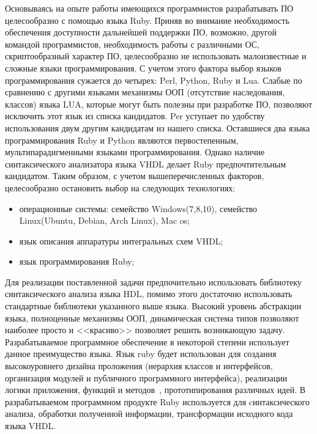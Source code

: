 Основываясь на опыте работы имеющихся программистов разрабатывать ПО целесообразно с помощью языка Ruby.
Приняв во внимание необходимость обеспечения доступности дальнейшей поддержки ПО, возможно, другой командой программистов, необходимость работы с различными ОС, скриптообразный характер ПО, целесообразно не использовать малоизвестные и сложные языки программирования.
С учетом этого фактора выбор языков программирования сужается до четырех: Perl, Python, Ruby и Lua.
Слабые по сравнению с другими языками механизмы ООП (отсутствие наследования, классов) языка LUA, которые могут быть полезны при разработке ПО, позволяют исключить этот язык из списка кандидатов.
Per уступает по удобству использования двум другим кандидатам из нашего списка.
Оставшиеся два языка программирования Ruby и Python являются первостепенным, мультипарадигменными языками программирования. Однако наличие синтаксического анализатора языка VHDL делает
Ruby предпочтительным кандидатом.
Таким образом, с учетом вышеперечисленных факторов, целесообразно остановить выбор на следующих технологиях:
\begin{itemize}
  \item операционные системы: семейство Windows(7,8,10), семейство Linux(Ubuntu, Debian, Arch Linux), Mac os;
  \item язык описания аппаратуры интегральных схем VHDL;
  \item язык программирования Ruby;
\end{itemize}
Для реализации поставленной задачи предпочительно использовать библиотеку синтаксического анализа языка HDL, помимо этого достаточно использовать стандартные библиотеки указанного выше языка.
Высокий уровень абстракции языка, полноценные механизмы ООП, динамическая система типов позволяют наиболее просто и <<красиво>> позволяет решить возникающую задачу.
Разрабатываемое программное обеспечение в некоторой степени использует данное преимущество языка.
Язык ruby будет использован для создания высокоуровнего дизайна проложения (иерархия классов и интерфейсов, организация модулей и публичного программного интерфейса), реализации логики приложения, функций и методов~\cite{dpir_2007}, прототипирования различных идей.
В разрабатываемом программном продукте Ruby используется для cинтаксического анализа, обработки полученной информации, трансформации исходного кода языка VHDL.


